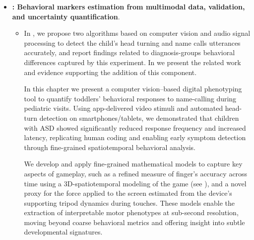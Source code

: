 \begin{itemize}
    \item \textbf{: Behavioral markers estimation from multimodal data, validation, and uncertainty quantification}. 
        \begin{itemize}
            \item In , we propose two algorithms based on computer vision and audio signal processing to detect the child's head turning and name calls utterances accurately, and report findings related to diagnosis-groups behavioral differences captured by this experiment. In  we present the related work and evidence supporting the addition of this component. 


            
            
            In this chapter we present a computer vision–based digital phenotyping tool to quantify toddlers' behavioral responses to name-calling during pediatric visits. Using app-delivered video stimuli and automated head-turn detection on smartphones/tablets, we demonstrated that children with ASD showed significantly reduced response frequency and increased latency, replicating human coding and enabling early symptom detection through fine-grained spatiotemporal behavioral analysis.

            We develop and apply fine-grained mathematical models to capture key aspects of gameplay, such as a refined measure of finger's accuracy across time using a 3D-spatiotemporal modeling of the game (see ), and a novel proxy for the force applied to the screen estimated from the device's supporting tripod dynamics during touches. These models enable the extraction of interpretable motor phenotypes at sub-second resolution, moving beyond coarse behavioral metrics and offering insight into subtle developmental signatures.






\end{itemize}
\end{itemize}
